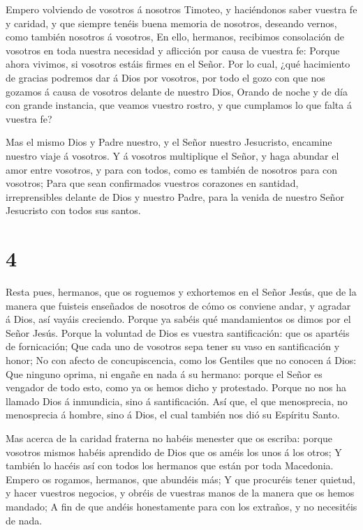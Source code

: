  Empero volviendo de vosotros á nosotros Timoteo, y
haciéndonos saber vuestra fe y caridad, y que siempre tenéis buena
memoria de nosotros, deseando vernos, como también nosotros á vosotros,
 En ello, hermanos, recibimos consolación de vosotros en
toda nuestra necesidad y aflicción por causa de vuestra fe: 
Porque ahora vivimos, si vosotros estáis firmes en el Señor.
 Por lo cual, ¿qué hacimiento de gracias podremos dar á Dios
por vosotros, por todo el gozo con que nos gozamos á causa de vosotros
delante de nuestro Dios,  Orando de noche y de día con
grande instancia, que veamos vuestro rostro, y que cumplamos lo que
falta á vuestra fe?

 Mas el mismo Dios y Padre nuestro, y el Señor nuestro
Jesucristo, encamine nuestro viaje á vosotros.  Y á
vosotros multiplique el Señor, y haga abundar el amor entre vosotros, y
para con todos, como es también de nosotros para con vosotros;
 Para que sean confirmados vuestros corazones en santidad,
irreprensibles delante de Dios y nuestro Padre, para la venida de
nuestro Señor Jesucristo con todos sus santos.

\hypertarget{section-3}{%
\section{4}\label{section-3}}

 Resta pues, hermanos, que os roguemos y exhortemos en el
Señor Jesús, que de la manera que fuisteis enseñados de nosotros de cómo
os conviene andar, y agradar á Dios, así vayáis creciendo. 
Porque ya sabéis qué mandamientos os dimos por el Señor Jesús.
 Porque la voluntad de Dios es vuestra santificación: que os
apartéis de fornicación;  Que cada uno de vosotros sepa
tener su vaso en santificación y honor;  No con afecto de
concupiscencia, como los Gentiles que no conocen á Dios: 
Que ninguno oprima, ni engañe en nada á su hermano: porque el Señor es
vengador de todo esto, como ya os hemos dicho y protestado. 
Porque no nos ha llamado Dios á inmundicia, sino á santificación.
 Así que, el que menosprecia, no menosprecia á hombre, sino
á Dios, el cual también nos dió su Espíritu Santo.

 Mas acerca de la caridad fraterna no habéis menester que os
escriba: porque vosotros mismos habéis aprendido de Dios que os améis
los unos á los otros;  Y también lo hacéis así con todos
los hermanos que están por toda Macedonia. Empero os rogamos, hermanos,
que abundéis más;  Y que procuréis tener quietud, y hacer
vuestros negocios, y obréis de vuestras manos de la manera que os hemos
mandado;  A fin de que andéis honestamente para con los
extraños, y no necesitéis de nada.

